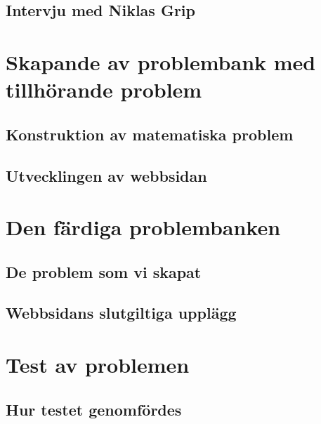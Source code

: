 \documentclass[11pt,a4paper]{article}
\begin{document}
    
    \subsection{Intervju med Niklas Grip}
    
    \label{sec:intervju}
    
\section{Skapande av problembank med tillhörande problem}
    \subsection{Konstruktion av matematiska problem}
    \label{sec:Skapandetavproblem}
        

    \subsection{Utvecklingen av webbsidan}
        
        
\section{Den färdiga problembanken}
        
    
    \subsection{De problem som vi skapat}
        
    
    \subsection{Webbsidans slutgiltiga upplägg}
        
    
\section{Test av problemen}
    
    \subsection{Hur testet genomfördes}
        
        
\end{document}
